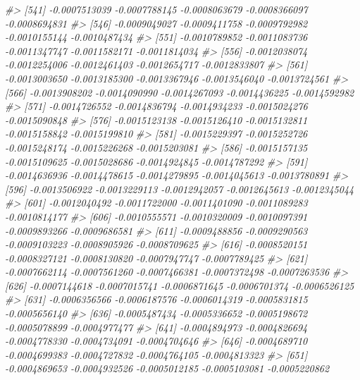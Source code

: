 \documentclass[
]{article}
\newenvironment{Shaded}{\begin{snugshade}}{\end{snugshade}}
\newcommand{\CommentTok}[1]{\textcolor[rgb]{0.56,0.35,0.01}{\textit{#1}}}
\begin{document}
\begin{Shaded}
\begin{Highlighting}[]
\CommentTok{\#\textgreater{} [541] {-}0.0007513039 {-}0.0007788145 {-}0.0008063679 {-}0.0008366097 {-}0.0008694831}
\CommentTok{\#\textgreater{} [546] {-}0.0009049027 {-}0.0009411758 {-}0.0009792982 {-}0.0010155144 {-}0.0010487434}
\CommentTok{\#\textgreater{} [551] {-}0.0010789852 {-}0.0011083736 {-}0.0011347747 {-}0.0011582171 {-}0.0011814034}
\CommentTok{\#\textgreater{} [556] {-}0.0012038074 {-}0.0012254006 {-}0.0012461403 {-}0.0012654717 {-}0.0012833807}
\CommentTok{\#\textgreater{} [561] {-}0.0013003650 {-}0.0013185300 {-}0.0013367946 {-}0.0013546040 {-}0.0013724561}
\CommentTok{\#\textgreater{} [566] {-}0.0013908202 {-}0.0014090990 {-}0.0014267093 {-}0.0014436225 {-}0.0014592982}
\CommentTok{\#\textgreater{} [571] {-}0.0014726552 {-}0.0014836794 {-}0.0014934233 {-}0.0015024276 {-}0.0015090848}
\CommentTok{\#\textgreater{} [576] {-}0.0015123138 {-}0.0015126410 {-}0.0015132811 {-}0.0015158842 {-}0.0015199810}
\CommentTok{\#\textgreater{} [581] {-}0.0015229397 {-}0.0015252726 {-}0.0015248174 {-}0.0015226268 {-}0.0015203081}
\CommentTok{\#\textgreater{} [586] {-}0.0015157135 {-}0.0015109625 {-}0.0015028686 {-}0.0014924845 {-}0.0014787292}
\CommentTok{\#\textgreater{} [591] {-}0.0014636936 {-}0.0014478615 {-}0.0014279895 {-}0.0014045613 {-}0.0013780891}
\CommentTok{\#\textgreater{} [596] {-}0.0013506922 {-}0.0013229113 {-}0.0012942057 {-}0.0012645613 {-}0.0012345044}
\CommentTok{\#\textgreater{} [601] {-}0.0012040492 {-}0.0011722000 {-}0.0011401090 {-}0.0011089283 {-}0.0010814177}
\CommentTok{\#\textgreater{} [606] {-}0.0010555571 {-}0.0010320009 {-}0.0010097391 {-}0.0009893266 {-}0.0009686581}
\CommentTok{\#\textgreater{} [611] {-}0.0009488856 {-}0.0009290563 {-}0.0009103223 {-}0.0008905926 {-}0.0008709625}
\CommentTok{\#\textgreater{} [616] {-}0.0008520151 {-}0.0008327121 {-}0.0008130820 {-}0.0007947747 {-}0.0007789425}
\CommentTok{\#\textgreater{} [621] {-}0.0007662114 {-}0.0007561260 {-}0.0007466381 {-}0.0007372498 {-}0.0007263536}
\CommentTok{\#\textgreater{} [626] {-}0.0007144618 {-}0.0007015741 {-}0.0006871645 {-}0.0006701374 {-}0.0006526125}
\CommentTok{\#\textgreater{} [631] {-}0.0006356566 {-}0.0006187576 {-}0.0006014319 {-}0.0005831815 {-}0.0005656140}
\CommentTok{\#\textgreater{} [636] {-}0.0005487434 {-}0.0005336652 {-}0.0005198672 {-}0.0005078899 {-}0.0004977477}
\CommentTok{\#\textgreater{} [641] {-}0.0004894973 {-}0.0004826694 {-}0.0004778330 {-}0.0004734091 {-}0.0004704646}
\CommentTok{\#\textgreater{} [646] {-}0.0004689710 {-}0.0004699383 {-}0.0004727832 {-}0.0004764105 {-}0.0004813323}
\CommentTok{\#\textgreater{} [651] {-}0.0004869653 {-}0.0004932526 {-}0.0005012185 {-}0.0005103081 {-}0.0005220862}

\end{Highlighting}
\end{Shaded}
\end{document}
